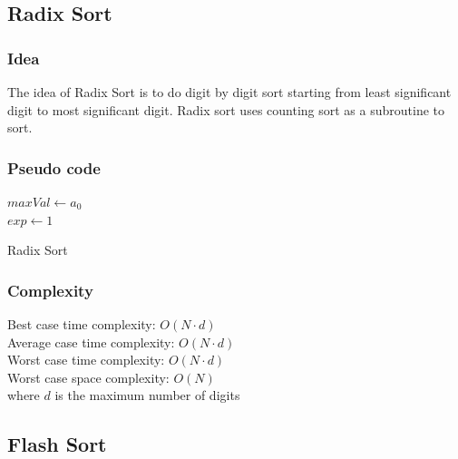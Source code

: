 \documentclass[11pt,a4paper]{article}
\begin{document}
\subsection{Radix Sort}
\subsubsection*{Idea}
The idea of Radix Sort is to do digit by digit sort starting from least significant digit to most significant digit. 
Radix sort uses counting sort as a subroutine to sort.

\subsubsection*{Pseudo code}
\begin{algorithm2e}
  \SetAlgoLined
  $maxVal \gets a_0$\\
  $exp \gets 1$\\
  
  \caption{Radix Sort}
\end{algorithm2e}

\subsubsection*{Complexity}
Best case time complexity: $O(N \cdot d)$ \\
Average case time complexity: $O(N \cdot d)$\\
Worst case time complexity: $O(N \cdot d)$ \\
Worst case space complexity: $O(N)$\\
where $d$ is the maximum number of digits

\subsection{Flash Sort}
\end{document}
